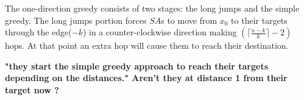  
% 
The one-direction greedy consists of two stages: the long jumps and the simple greedy. The long jumps portion forces $SA$s to move from $x_{0}$ to their targets through the edge($-k$) in a counter-clockwise direction making  $(\lceil  \frac {n-k}{k} \rceil -2)$ hops. At that point an extra hop will cause them to reach their destination.

{\bf "they start the simple greedy approach to reach their targets depending on the distances." Aren't they at distance 1 from their target now ?}






